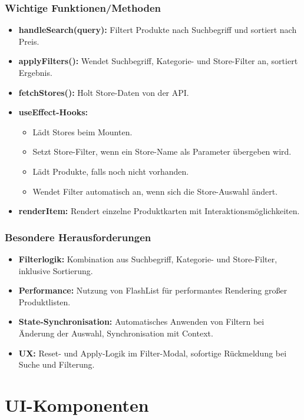 \documentclass[12pt, a4paper]{report} %
\begin{document}
\subsubsection{Wichtige Funktionen/Methoden}
\begin{itemize}
    \item \textbf{handleSearch(query):} Filtert Produkte nach Suchbegriff und sortiert nach Preis.
    \item \textbf{applyFilters():} Wendet Suchbegriff, Kategorie- und Store-Filter an, sortiert Ergebnis.
    \item \textbf{fetchStores():} Holt Store-Daten von der API.
    \item \textbf{useEffect-Hooks:}
    \begin{itemize}
        \item Lädt Stores beim Mounten.
        \item Setzt Store-Filter, wenn ein Store-Name als Parameter übergeben wird.
        \item Lädt Produkte, falls noch nicht vorhanden.
        \item Wendet Filter automatisch an, wenn sich die Store-Auswahl ändert.
    \end{itemize}
    \item \textbf{renderItem:} Rendert einzelne Produktkarten mit Interaktionsmöglichkeiten.
\end{itemize}

\subsubsection{Besondere Herausforderungen}
\begin{itemize}
    \item \textbf{Filterlogik:} Kombination aus Suchbegriff, Kategorie- und Store-Filter, inklusive Sortierung.
    \item \textbf{Performance:} Nutzung von FlashList für performantes Rendering großer Produktlisten.
    \item \textbf{State-Synchronisation:} Automatisches Anwenden von Filtern bei Änderung der Auswahl, Synchronisation mit Context.
    \item \textbf{UX:} Reset- und Apply-Logik im Filter-Modal, sofortige Rückmeldung bei Suche und Filterung.
\end{itemize}

\section{UI-Komponenten}
\label{sec:ui_komponenten}
\end{document}
